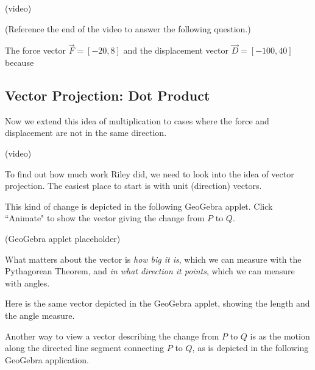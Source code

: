 \documentclass{ximera}
\begin{document}
(video)

\begin{problem}
    (Reference the end of the video to answer the following question.)

    The force vector $\vec{F}=[-20,8]$ and the displacement vector $\vec{D}=[-100,40]$  because 
\end{problem}

\subsection*{Vector Projection: Dot Product}

Now we extend this idea of multiplication to cases where the force and displacement are not in the same direction.

(video)

To find out how much work Riley did, we need to look into the idea of vector projection. The easiest place to start is with unit (direction) vectors.







This kind of change is depicted in the following GeoGebra applet. Click ``Animate" to show the vector giving the change from $P$ to $Q$.

(GeoGebra applet placeholder)

What matters about the vector is \emph{how big it is}, which we can measure with the Pythagorean Theorem, and \emph{in what direction it points}, which we can measure with angles.

Here is the same vector depicted in the GeoGebra applet, showing the length and the angle measure. 

\begin{center}
\end{center}

Another way to view a vector describing the change from $P$ to $Q$ is as the motion along the directed line segment connecting $P$ to $Q$, as is depicted in the following GeoGebra application.
\end{document}
